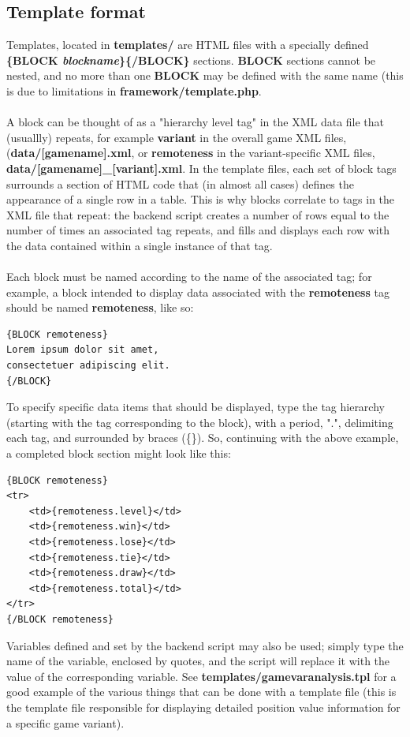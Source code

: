 \documentclass[11pt]{article}
\begin{document}
\subsection{Template format}
Templates, located in \textbf{templates/} are HTML files with a specially defined \textbf{\{BLOCK \textit{blockname}\}\{/BLOCK\}} sections. \textbf{BLOCK} sections cannot be nested, and no more than one \textbf{BLOCK} may be defined with the same name (this is due to limitations in \textbf{framework/template.php}.\\\\
A block can be thought of as a "hierarchy level tag" in the XML data file that (usuallly) repeats, for example \textbf{variant} in the overall game XML files, (\textbf{data/[gamename].xml}, or \textbf{remoteness} in the variant-specific XML files, \textbf{data/[gamename]\_[variant].xml}. In the template files, each set of block tags surrounds a section of HTML code that (in almost all cases) defines the appearance of a single row in a table. This is why blocks correlate to tags in the XML file that repeat: the backend script creates a number of rows equal to the number of times an associated tag repeats, and fills and displays each row with the data contained within a single instance of that tag.\\\\
Each block must be named according to the name of the associated tag; for example, a block intended to display data associated with the \textbf{remoteness} tag should be named \textbf{remoteness}, like so:
\begin{verbatim}
{BLOCK remoteness}
Lorem ipsum dolor sit amet,
consectetuer adipiscing elit.
{/BLOCK}
\end{verbatim}
To specify specific data items that should be displayed, type the tag hierarchy (starting with the tag corresponding to the block), with a period, ".", delimiting each tag, and surrounded by braces (\{\}). So, continuing with the above example, a completed block section might look like this:
\begin{verbatim}
{BLOCK remoteness}
<tr>
	<td>{remoteness.level}</td>
	<td>{remoteness.win}</td>
	<td>{remoteness.lose}</td>
	<td>{remoteness.tie}</td>
	<td>{remoteness.draw}</td>
	<td>{remoteness.total}</td>
</tr>
{/BLOCK remoteness}
\end{verbatim}
Variables defined and set by the backend script may also be used; simply type the name of the variable, enclosed by quotes, and the script will replace it with the value of the corresponding variable. See \textbf{templates/gamevaranalysis.tpl} for a good example of the various things that can be done with a template file (this is the template file responsible for displaying detailed position value information for a specific game variant).
\end{document}

